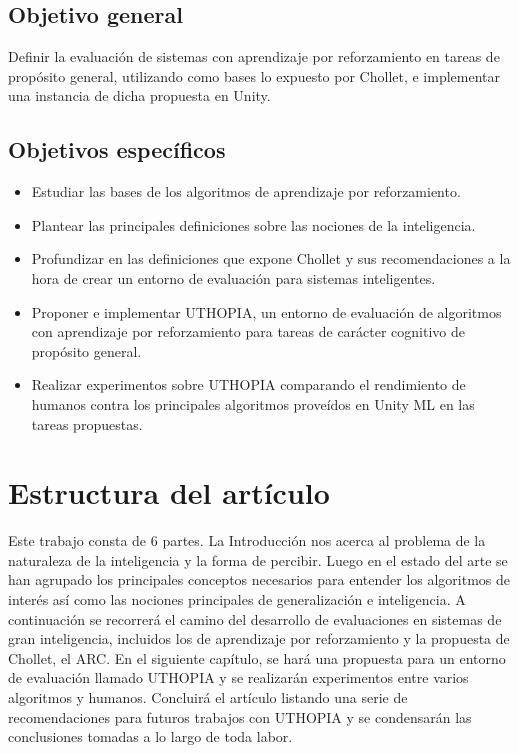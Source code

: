 \subsection*{Objetivo general}
Definir la evaluación de sistemas con aprendizaje por reforzamiento en tareas de propósito general, utilizando como bases lo expuesto por Chollet, e implementar una instancia de dicha propuesta en Unity.

\subsection*{Objetivos específicos}
\begin{itemize}
    \item Estudiar las bases de los algoritmos de aprendizaje por reforzamiento.
    \item Plantear las principales definiciones sobre las nociones de la inteligencia.
    \item Profundizar en las definiciones que expone Chollet y sus recomendaciones a la hora de crear un entorno de evaluación para sistemas inteligentes.
    \item Proponer e implementar UTHOPIA, un entorno de evaluación de algoritmos con aprendizaje por reforzamiento para tareas de carácter cognitivo de propósito general.
    \item Realizar experimentos sobre UTHOPIA comparando el rendimiento de humanos contra los principales algoritmos proveídos en Unity ML en las tareas propuestas.
\end{itemize}

\section*{Estructura del artículo}
Este trabajo consta de 6 partes. La Introducción nos acerca al problema de la naturaleza de la inteligencia y la forma de percibir. Luego en el estado del arte se han agrupado los principales conceptos necesarios para entender los algoritmos de interés así como las nociones principales de generalización e inteligencia. A continuación se recorrerá el camino del desarrollo de evaluaciones en sistemas de gran inteligencia, incluidos los de aprendizaje por reforzamiento y la propuesta de Chollet, el ARC. En el siguiente capítulo, se hará una propuesta para un entorno de evaluación llamado UTHOPIA y se realizarán experimentos entre varios algoritmos y humanos. Concluirá el artículo listando una serie de recomendaciones para futuros trabajos con UTHOPIA y se condensarán las conclusiones tomadas a lo largo de toda labor. 


